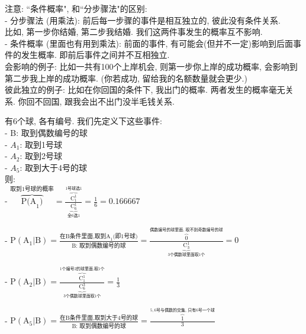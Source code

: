 \documentclass[UTF8]{ctexart}
\begin{document}
	
	注意: ``条件概率", 和``分步骤法"的区别: \\
	- 分步骤法 (用乘法): 前后每一步骤的事件是相互独立的, 彼此没有条件关系.  \\
	比如, 第一步你结婚, 第二步我结婚. 我们这两件事发生的概率互不影响. \\
	
	- 条件概率 (里面也有用到乘法): 前面的事件, 有可能会(但并不一定)影响到后面事件的发生概率. 即前后事件之间并不互相独立.  \\
	会影响的例子: 比如一共有100个上岸机会, 则第一步你上岸的成功概率, 会影响到第二步我上岸的成功概率. (你若成功, 留给我的名额数量就会更少.) \\
	彼此独立的例子: 比如在你回国的条件下, 我出门的概率. 两者发生的概率毫无关系. 你回不回国, 跟我会出不出门没半毛钱关系. \\

		
	
	
	\begin{myEnvSample}
		有6个球, 各有编号.  我们先定义下这些事件: \\
		- B: 取到偶数编号的球 \\
		- $A_1$: 取到1号球 \\
		- $A_2$: 取到2号球 \\
		- $A_5$: 取到大于4号的球 \\
		
		则: \\
		- $
		\overset{\text{取到1号球的概率}}{\overbrace{\text{P(A}_1\text{)}}}=\frac{\overset{1\text{号球选}1}{\overbrace{\text{C}_{1}^{1}}}}{\underset{\text{全6选}1}{\underbrace{\text{C}_{6}^{1}}}}=\frac{1}{6}=0.166667
		$
		
		- $
		\text{P}\left( \text{A}_1|\text{B} \right) =\frac{\text{在B条件里面,取到A}_1\text{(即1号球)}}{\text{B:\ 取到偶数编号的球}}=\frac{\overset{\text{偶数编号的球里面,\ 取不到奇数编号的球}}{\overbrace{0}}}{\underset{3\text{个偶数球里面取1个}}{\underbrace{\text{C}_{3}^{1}}}}=0
		$
		
		- $
		\text{P}\left( \text{A}_2|\text{B} \right) =\frac{\overset{1\text{个编号2的球里面,取1个}}{\overbrace{\text{C}_{1}^{1}}}}{\underset{3\text{个偶数球里面取1个}}{\underbrace{\text{C}_{6}^{3}}}}=\frac{1}{3}
		$
		
		- $
		\text{P}\left( \text{A}_5|\text{B} \right) =\frac{\text{在B条件里面,取到大于4号的球}}{\text{B:\ 取到偶数编号的球}}=\frac{\overset{5,6\text{号与偶数的交集,\ 只有6号一个球}}{\overbrace{1}}}{3}
		$
			
	\end{myEnvSample}
	\vspace{1em} 
	
\end{document}
